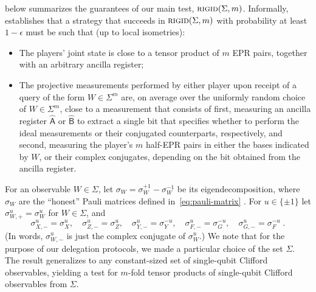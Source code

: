 \documentclass{toc}
\newcommand{\reg}[1]{{\textsf{#1}}}
\newcommand{\rigid}{\textsc{rigid}}
\begin{document}
 below summarizes the guarantees of our main
test,  $\rigid(\Sigma,m)$. Informally,  establishes that a strategy that succeeds in $\rigid(\Sigma,m)$ with probability at least  $1-\epsilon$ must be such that (up to local isometries):
\begin{itemize}
    \item The players' joint state is close to a tensor product of $m$ EPR pairs, together with an arbitrary ancilla register;
    \item The projective measurements performed by either player upon receipt of a query of the form $W\in\Sigma^m$ are, on average over the uniformly random choice of $W\in\Sigma^m$, close to a measurement that consists of first, measuring an ancilla register $\hat{\reg{A}}$ or $\hat{\reg{B}}$
to extract a single bit that specifies whether to perform the ideal measurements or their conjugated counterparts, 
respectively, %
and second, measuring the player's $m$ half-EPR pairs in either the bases indicated by $W$, or their complex %
conjugates,  %
depending on the bit obtained from the ancilla register. 
\end{itemize}

For an observable $W\in\Sigma$, let $\sigma_W = \sigma_W^{+1} - \sigma_W^{-1}$ be its eigendecomposition, where $\sigma_W$ are the ``honest'' Pauli matrices defined in~\eqref{eq:pauli-matrix} . For $u\in\{\pm 1\}$ let $\sigma_{W,+}^u = \sigma_W^u$ for $W\in \Sigma$, and 
$$ \sigma_{X,-}^u = \sigma_X^u,\quad\sigma_{Z,-}^u = \sigma_Z^u,\quad\sigma_{Y,-}^u = \sigma_Y^{-u},\quad\sigma_{F,-}^u = \sigma_G^{-u},\quad\sigma_{G,-}^u = \sigma_F^{-u}\;.$$
(In words, $\sigma_{W,-}^u$ is just the complex conjugate of $\sigma_W^u$.) We note that for the purpose of our delegation protocols, we made a particular choice of the set $\Sigma$. The result generalizes to any constant-sized set of single-qubit Clifford observables,  yielding a test for $m$-fold tensor products of single-qubit Clifford observables from $\Sigma$.
\end{document}

